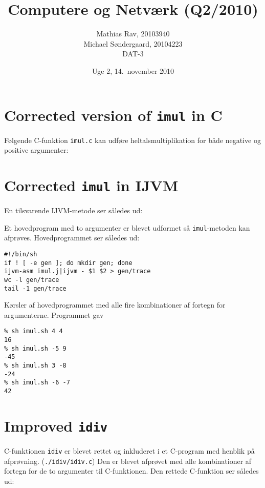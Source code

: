 \documentclass[12pt,a4paper]{article}
\title{Computere og Netværk (Q2/2010)}
\author{Mathias Rav, 20103940 \\
		Michael Søndergaard, 20104223 \\
		DAT-3}
\date{Uge 2, 14.\ november 2010}
\newcommand{\imul}{\texttt{imul}}
\begin{document}
\maketitle

\section{Corrected version of \imul{} in C}

Følgende C-funktion \texttt{imul.c} kan udføre heltalsmultiplikation for både
negative og positive argumenter:

\lstset{language=C}


\section{Corrected \imul{} in IJVM}

En tilsvarende IJVM-metode ser således ud:

\lstset{language=JVMIS}


Et hovedprogram med to argumenter er blevet udformet så \texttt{imul}-metoden
kan afprøves. Hovedprogrammet ser således ud:

\lstset{language=sh}
\begin{lstlisting}
#!/bin/sh
if ! [ -e gen ]; do mkdir gen; done
ijvm-asm imul.j|ijvm - $1 $2 > gen/trace
wc -l gen/trace
tail -1 gen/trace
\end{lstlisting}

\clearpage

Kørsler af hovedprogrammet med alle fire kombinationer af fortegn for argumenterne. Programmet gav

\lstset{language=sh}
\begin{lstlisting}
% sh imul.sh 4 4
16
% sh imul.sh -5 9
-45
% sh imul.sh 3 -8
-24
% sh imul.sh -6 -7
42
\end{lstlisting}

\section{Improved \texttt{idiv}}

C-funktionen \texttt{idiv} er blevet rettet og inkluderet i et C-program med
henblik på afprøvning. (\texttt{./idiv/idiv.c}) Den er blevet afprøvet med alle
kombinationer af fortegn for de to argumenter til C-funktionen.  Den rettede
C-funktion ser således ud:
\end{document}
